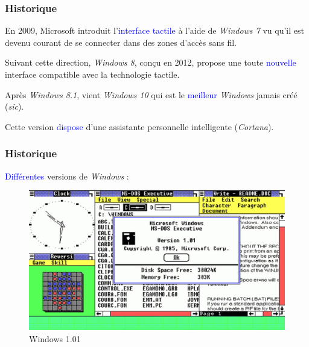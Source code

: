 \documentclass[aspectratio=169]{beamer}
\begin{document}
\begin{frame}
  \frametitle{Historique}
  En 2009, Microsoft introduit l'\textcolor{blue}{interface tactile} à l'aide
  de \textit{Windows 7} vu qu'il est devenu courant de se connecter dans des zones
  d'accès sans fil.

  \hspace{0.5cm}

  Suivant cette direction, \textit{Windows 8}, conçu en 2012, propose une toute
  \textcolor{blue}{nouvelle} interface compatible avec la technologie tactile.

  \hspace{0.5cm}

  Après \textit{Windows 8.1}, vient \textit{Windows 10} qui est le \textcolor{blue}{meilleur}
  \textit{Windows} jamais créé (\textit{sic}).

  \hspace{0.5cm}

  Cette version \textcolor{blue}{dispose} d'une assistante personnelle
  intelligente (\textit{Cortana}).
\end{frame}

\begin{frame}
  \frametitle{Historique}
  \textcolor{blue}{Différentes} versions de \textit{Windows} :

  \begin{figure}[!h]
    \center
    \includegraphics[scale=0.28]
    {textures/images/windows/historic/Win1.png}
    \caption{Windows 1.01}
  \end{figure}
\end{frame}
\end{document}
